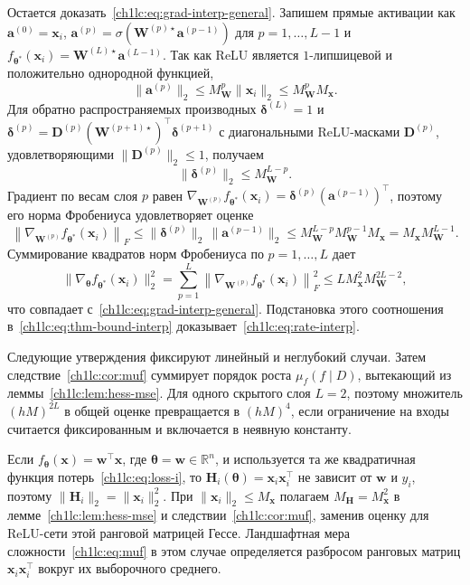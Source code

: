 Остается доказать~\eqref{ch1lc:eq:grad-interp-general}.
Запишем прямые активации как $\mathbf{a}^{(0)}=\mathbf{x}_i$,
$\mathbf{a}^{(p)}=\sigma(\mathbf{W}^{(p)\star}\mathbf{a}^{(p-1)})$ для $p=1,\dots,L-1$ и
$f_{\boldsymbol{\theta}^*}(\mathbf{x}_i)=\mathbf{W}^{(L)\star}\mathbf{a}^{(L-1)}$.
Так как ReLU является $1$-липшицевой и положительно однородной функцией,
\[
  \|\mathbf{a}^{(p)}\|_2 \le M_{\mathbf{W}}^{p}\|\mathbf{x}_i\|_2 \le M_{\mathbf{W}}^{p}M_{\mathbf{x}} .
\]
Для обратно распространяемых производных $\boldsymbol{\delta}^{(L)}=1$ и
$\boldsymbol{\delta}^{(p)}=\mathbf{D}^{(p)}(\mathbf{W}^{(p+1)\star})^\top \boldsymbol{\delta}^{(p+1)}$ с диагональными ReLU-масками $\mathbf{D}^{(p)}$, удовлетворяющими $\|\mathbf{D}^{(p)}\|_2\le 1$, получаем
\[
  \|\boldsymbol{\delta}^{(p)}\|_2 \le M_{\mathbf{W}}^{L-p}.
\]
Градиент по весам слоя $p$ равен
$\nabla_{\mathbf{W}^{(p)}} f_{\boldsymbol{\theta}^*}(\mathbf{x}_i)
 = \boldsymbol{\delta}^{(p)}(\mathbf{a}^{(p-1)})^\top$,
поэтому его норма Фробениуса удовлетворяет оценке
\[
  \left\|\nabla_{\mathbf{W}^{(p)}} f_{\boldsymbol{\theta}^*}(\mathbf{x}_i)\right\|_F
  \le \|\boldsymbol{\delta}^{(p)}\|_2\,\|\mathbf{a}^{(p-1)}\|_2
  \le M_{\mathbf{W}}^{L-p} M_{\mathbf{W}}^{p-1} M_{\mathbf{x}}
  = M_{\mathbf{x}} M_{\mathbf{W}}^{L-1}.
\]
Суммирование квадратов норм Фробениуса по $p=1,\dots,L$ дает
\[
  \bigl\|\nabla_{\boldsymbol{\theta}}f_{\boldsymbol{\theta}^*}(\mathbf{x}_i)\bigr\|_2^2
  = \sum_{p=1}^{L}\left\|\nabla_{\mathbf{W}^{(p)}} f_{\boldsymbol{\theta}^*}(\mathbf{x}_i)\right\|_F^2
  \le L M_{\mathbf{x}}^2 M_{\mathbf{W}}^{2L-2},
\]
что совпадает с~\eqref{ch1lc:eq:grad-interp-general}. Подстановка этого соотношения в~\eqref{ch1lc:eq:thm-bound-interp}
доказывает~\eqref{ch1lc:eq:rate-interp}.


Следующие утверждения фиксируют линейный и неглубокий случаи. Затем следствие~\ref{ch1lc:cor:muf} суммирует порядок роста $\mu_f(f\mid D)$, вытекающий из леммы~\ref{ch1lc:lem:hess-mse}.
Для одного скрытого слоя $L=2$, поэтому множитель $(hM)^{2L}$ в общей оценке превращается в $(hM)^4$, если ограничение на входы считается фиксированным и включается в неявную константу.

\begin{corollary}\label{ch1lc:cor:linear}
Если $f_{\boldsymbol{\theta}}(\mathbf{x})=\mathbf{w}^{\top}\mathbf{x}$, где $\boldsymbol{\theta}=\mathbf{w}\in\mathbb{R}^{n}$, и используется та же квадратичная функция потерь~\eqref{ch1lc:eq:loss-i}, то
$\mathbf{H}_i(\boldsymbol{\theta})=\mathbf{x}_i\mathbf{x}_i^{\top}$ не зависит от $\mathbf{w}$ и $y_i$, поэтому
$\|\mathbf{H}_i\|_2=\|\mathbf{x}_i\|_2^2$.
При $\|\mathbf{x}_i\|_2\le M_{\mathbf{x}}$ полагаем $M_{\mathbf{H}}=M_{\mathbf{x}}^2$ в лемме~\ref{ch1lc:lem:hess-mse} и следствии~\ref{ch1lc:cor:muf}, заменив оценку для ReLU-сети этой ранговой матрицей Гессе.
Ландшафтная мера сложности~\eqref{ch1lc:eq:muf} в этом случае определяется разбросом ранговых матриц $\mathbf{x}_i\mathbf{x}_i^{\top}$ вокруг их выборочного среднего.
\end{corollary}

